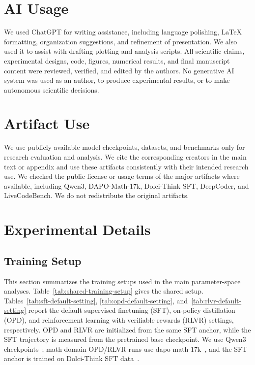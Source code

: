 \documentclass{llmxive}
\begin{document}
\appendix

\section{AI Usage}
We used ChatGPT for writing assistance, including language polishing,
LaTeX formatting, organization suggestions, and refinement of presentation.
We also used it to assist with drafting plotting and analysis scripts.
All scientific claims, experimental designs, code, figures, numerical
results, and final manuscript content were reviewed, verified, and edited
by the authors. No generative AI system was used as an author, to produce
experimental results, or to make autonomous scientific decisions.


\section{Artifact Use}
We use publicly available model checkpoints, datasets, and benchmarks only
for research evaluation and analysis. We cite the corresponding creators in
the main text or appendix and use these artifacts consistently with their
intended research use. We checked the public license or usage terms of the
major artifacts where available, including Qwen3, DAPO-Math-17k,
Dolci-Think SFT, DeepCoder, and LiveCodeBench. We do not redistribute the
original artifacts.

\section{Experimental Details}
\label{app:experimental-details}

\subsection{Training Setup}
\label{app:training-setup}

This section summarizes the training setups used in the main
parameter-space analyses. Table~\ref{tab:shared-training-setup} gives the
shared setup. Tables~\ref{tab:sft-default-setting},
\ref{tab:opd-default-setting}, and~\ref{tab:rlvr-default-setting} report
the default supervised finetuning (SFT), on-policy distillation (OPD), and reinforcement learning with verifiable rewards (RLVR) settings, respectively. OPD and RLVR are initialized from the same SFT anchor, while the SFT trajectory is measured from the pretrained base checkpoint. We use Qwen3 checkpoints~\cite{yang2025qwen3technicalreport}; math-domain
OPD/RLVR runs use dapo-math-17k~\cite{yu2025dapoopensourcellmreinforcement},
and the SFT anchor is trained on Dolci-Think SFT data~\cite{olmo2025olmo3}.
\end{document}
